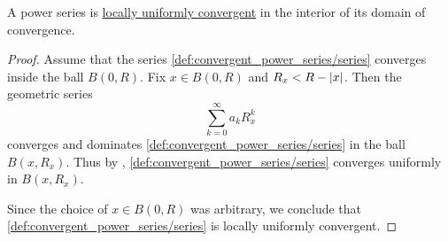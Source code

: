 \begin{proposition}\label{thm:power_series_are_locally_uniform_convergent}
  A power series is \hyperref[def:function_net_convergence/locally_uniform]{locally uniformly convergent} in the interior of its domain of convergence.
\end{proposition}
\begin{proof}
  Assume that the series \eqref{def:convergent_power_series/series} converges inside the ball \( B(0, R) \). Fix \( x \in B(0, R) \) and \( R_x < R - \left\vert x \right\vert \). Then the geometric series
  \begin{equation*}
    \sum_{k=0}^\infty a_k R_x^k
  \end{equation*}
  converges and dominates \eqref{def:convergent_power_series/series} in the ball \( B(x, R_x) \). Thus by , \eqref{def:convergent_power_series/series} converges uniformly in \( B(x, R_x) \).

  Since the choice of \( x \in B(0, R) \) was arbitrary, we conclude that \eqref{def:convergent_power_series/series} is locally uniformly convergent.
\end{proof}

